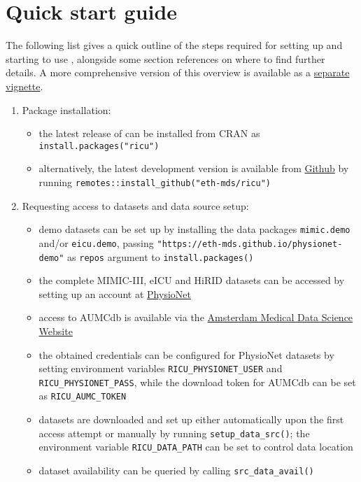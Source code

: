 \documentclass[
  notitle]{jss}
\begin{document}
\hypertarget{quick-start-guide}{%
\section{Quick start guide}\label{quick-start-guide}}

The following list gives a quick outline of the steps required for
setting up and starting to use , alongside some section
references on where to find further details. A more comprehensive
version of this overview is available as a
\href{https://CRAN.R-project.org/package=ricu/vignettes/ricu.html}{separate
vignette}.

\begin{enumerate}
\def\labelenumi{\arabic{enumi}.}
\item
  Package installation:

  \begin{itemize}
  \item
    the latest release of  can be installed from CRAN as
    \texttt{install.packages("ricu")}
  \item
    alternatively, the latest development version is available from
    \href{https://github.com/eth-mds/ricu}{Github} by running
    \texttt{remotes::install\_github("eth-mds/ricu")}
  \end{itemize}
\item
  Requesting access to datasets and data source setup:

  \begin{itemize}
  \item
    demo datasets can be set up by installing the data packages
    \texttt{mimic.demo} and/or \texttt{eicu.demo}, passing
    \texttt{"https://eth-mds.github.io/physionet-demo"} as
    \texttt{repos} argument to \texttt{install.packages()}
  \item
    the complete MIMIC-III, eICU and HiRID datasets can be accessed by
    setting up an account at
    \href{https://physionet.org/register}{PhysioNet}
  \item
    access to AUMCdb is available via the
    \href{https://amsterdammedicaldatascience.nl/\#amsterdamumcdb}{Amsterdam
    Medical Data Science Website}
  \item
    the obtained credentials can be configured for PhysioNet datasets by
    setting environment variables \texttt{RICU\_PHYSIONET\_USER} and
    \texttt{RICU\_PHYSIONET\_PASS}, while the download token for AUMCdb
    can be set as \texttt{RICU\_AUMC\_TOKEN}
  \item
    datasets are downloaded and set up either automatically upon the
    first access attempt or manually by running
    \texttt{setup\_data\_src()}; the environment variable
    \texttt{RICU\_DATA\_PATH} can be set to control data location
  \item
    dataset availability can be queried by calling
    \texttt{src\_data\_avail()}
  \end{itemize}


\end{enumerate}
\end{document}
